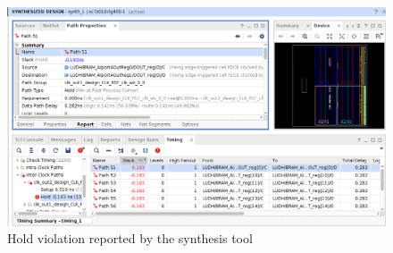 \begin{figure}
    \centering
    \includegraphics[width = \linewidth]{./Results/timingRepor.png}
    \caption{Hold violation reported by the synthesis tool}
    \label{fig:res:bram}
\end{figure}


